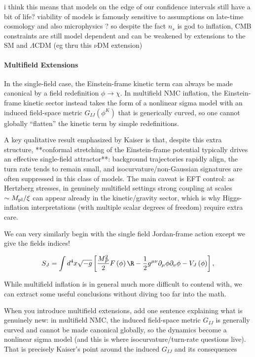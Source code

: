  i think this means that models on the edge of our confidence intervals still have a bit of life? viability of models is famously sensitive to assumptions on late-time cosmology and also microphysics ? so despite the fact $n_s$ is god to inflation, CMB constraints are still model dependent and can be weakened by extensions to the SM and $\Lambda$CDM (eg thru this $\nu$DM extension)

\paragraph{Multifield Extensions}


In the single-field case, the Einstein-frame kinetic term can always be made canonical by a field redefinition $\phi\to\chi$. In multifield NMC inflation, the Einstein-frame kinetic sector instead takes the form of a nonlinear sigma model with an induced field-space metric $G_{IJ}(\phi^K)$ that is generically curved, so one cannot globally “flatten” the kinetic term by simple redefinitions. 

A key qualitative result emphasized by Kaiser is that, despite this extra structure, **conformal stretching of the Einstein-frame potential typically drives an effective single-field attractor**: background trajectories rapidly align, the turn rate tends to remain small, and isocurvature/non-Gaussian signatures are often suppressed in this class of models. The main caveat is EFT control: as Hertzberg stresses, in genuinely multifield settings strong coupling at scales $\sim M_{\rm pl}/\xi$ can appear already in the kinetic/gravity sector, which is why Higgs-inflation interpretations (with multiple scalar degrees of freedom) require extra care.
\[\]



We can very similarly begin with the single field Jordan-frame action except we give the fields indices!

\[
S_J=\int d^4 x \sqrt{-g}\left[\frac{M_P^2}{2} F\left(\phi\right) \R-\frac{1}{2} g^{\mu \nu} \partial_\mu \phi \partial_\nu \phi-V_J\left(\phi\right)\right],
\]

While multifield inflation is in general much more difficult to contend with, we can extract some useful conclusions without diving too far into the math.


When you introduce multifield extensions, add one sentence explaining what is genuinely new: in multifield NMC, the induced field-space metric $G_{I J}$ is generally curved and cannot be made canonical globally, so the dynamics become a nonlinear sigma model (and this is where isocurvature/turn-rate questions live). That is precisely Kaiser's point around the induced $G_{I J}$ and its consequences



